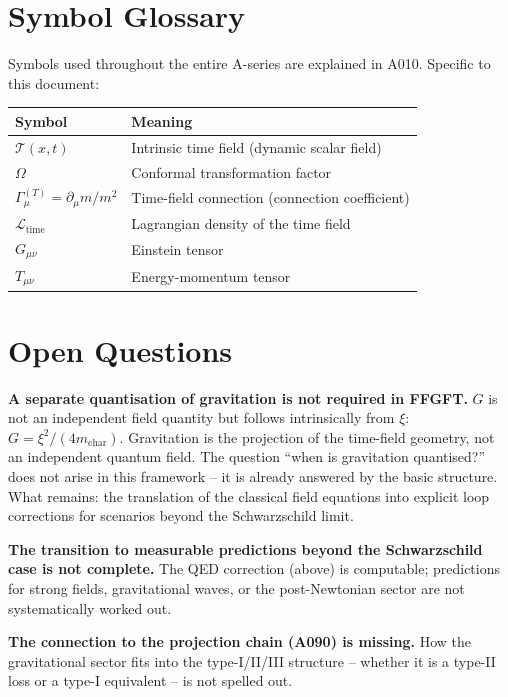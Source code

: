 \section{Symbol Glossary}

Symbols used throughout the entire A-series are explained in A010.
Specific to this document:

\begin{center}
\renewcommand{\arraystretch}{1.3}
{\small\begin{tabular}{lp{9cm}}
\toprule
Symbol & Meaning \\
\midrule
$\mathcal{T}(x,t)$ & Intrinsic time field (dynamic scalar field) \\
$\Omega$ & Conformal transformation factor \\
$\Gamma_\mu^{(T)}=\partial_\mu m/m^2$ & Time-field connection (connection coefficient) \\
$\mathcal{L}_\text{time}$ & Lagrangian density of the time field \\
$G_{\mu\nu}$ & Einstein tensor \\
$T_{\mu\nu}$ & Energy-momentum tensor \\
\bottomrule
\end{tabular}}
\renewcommand{\arraystretch}{1.0}
\end{center}

\section{Open Questions}

\textbf{A separate quantisation of gravitation is not required in FFGFT.}
$G$ is not an independent field quantity but follows intrinsically from $\xi$:
$G=\xi^2/(4m_\text{char})$. Gravitation is the projection of the time-field
geometry, not an independent quantum field. The question ``when is gravitation
quantised?'' does not arise in this framework -- it is already answered by the
basic structure. What remains: the translation of the classical field equations
into explicit loop corrections for scenarios beyond the Schwarzschild limit.

\textbf{The transition to measurable predictions beyond the Schwarzschild case is
not complete.} The QED correction (above) is computable; predictions for strong
fields, gravitational waves, or the post-Newtonian sector are not systematically
worked out.

\textbf{The connection to the projection chain (A090) is missing.} How the
gravitational sector fits into the type-I/II/III structure -- whether it is a
type-II loss or a type-I equivalent -- is not spelled out.

